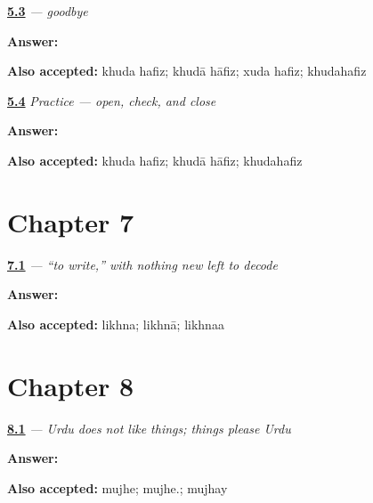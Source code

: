\noindent\begin{minipage}[t]{\linewidth}
\raggedright
\hyperlink{review-UR-C05-khuda-hafiz-goodbye}{\textbf{5.3}} \emph{  — goodbye}\par
\small \textbf{Answer:}  \par
\footnotesize \textbf{Also accepted:} khuda hafiz; khudā hāfiz; xuda hafiz; khudahafiz
\end{minipage}\par\medskip

\noindent\begin{minipage}[t]{\linewidth}
\raggedright
\hyperlink{review-UR-C05-practice-final-line}{\textbf{5.4}} \emph{Practice — open, check, and close}\par
\small \textbf{Answer:}  \par
\footnotesize \textbf{Also accepted:} khuda hafiz; khudā hāfiz; khudahafiz
\end{minipage}\par\medskip

\section*{Chapter 7}

\noindent\begin{minipage}[t]{\linewidth}
\raggedright
\hyperlink{review-UR-C07-likhna-four-stems}{\textbf{7.1}} \emph{ — “to write,” with nothing new left to decode}\par
\small \textbf{Answer:} \par
\footnotesize \textbf{Also accepted:} likhna; likhnā; likhnaa
\end{minipage}\par\medskip

\section*{Chapter 8}

\noindent\begin{minipage}[t]{\linewidth}
\raggedright
\hyperlink{review-UR-C08-pasand-dative}{\textbf{8.1}} \emph{ — Urdu does not like things; things please Urdu}\par
\small \textbf{Answer:} \par
\footnotesize \textbf{Also accepted:} mujhe; mujhe.; mujhay
\end{minipage}\par\medskip


